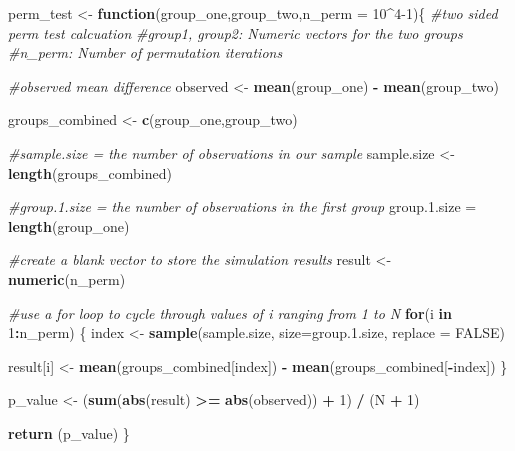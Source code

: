 \documentclass[
]{article}
\newenvironment{Shaded}{\begin{snugshade}}{\end{snugshade}}
\newcommand{\AttributeTok}[1]{\textcolor[rgb]{0.13,0.29,0.53}{#1}}
\newcommand{\CommentTok}[1]{\textcolor[rgb]{0.56,0.35,0.01}{\textit{#1}}}
\newcommand{\ConstantTok}[1]{\textcolor[rgb]{0.56,0.35,0.01}{#1}}
\newcommand{\ControlFlowTok}[1]{\textcolor[rgb]{0.13,0.29,0.53}{\textbf{#1}}}
\newcommand{\DecValTok}[1]{\textcolor[rgb]{0.00,0.00,0.81}{#1}}
\newcommand{\FloatTok}[1]{\textcolor[rgb]{0.00,0.00,0.81}{#1}}
\newcommand{\FunctionTok}[1]{\textcolor[rgb]{0.13,0.29,0.53}{\textbf{#1}}}
\newcommand{\NormalTok}[1]{#1}
\newcommand{\OtherTok}[1]{\textcolor[rgb]{0.56,0.35,0.01}{#1}}
\newcommand{\SpecialCharTok}[1]{\textcolor[rgb]{0.81,0.36,0.00}{\textbf{#1}}}
\begin{document}
\begin{Shaded}
\begin{Highlighting}[]
\NormalTok{perm\_test }\OtherTok{\textless{}{-}} \ControlFlowTok{function}\NormalTok{(group\_one,group\_two,}\AttributeTok{n\_perm =} \DecValTok{10}\SpecialCharTok{\^{}}\DecValTok{4{-}1}\NormalTok{)\{}
\CommentTok{\#two sided perm test calcuation}
\CommentTok{\#group1, group2: Numeric vectors for the two groups}
\CommentTok{\#n\_perm: Number of permutation iterations}
  
  \CommentTok{\#observed mean difference}
\NormalTok{  observed }\OtherTok{\textless{}{-}} \FunctionTok{mean}\NormalTok{(group\_one) }\SpecialCharTok{{-}} \FunctionTok{mean}\NormalTok{(group\_two)}

\NormalTok{  groups\_combined }\OtherTok{\textless{}{-}} \FunctionTok{c}\NormalTok{(group\_one,group\_two)}

  \CommentTok{\#sample.size = the number of observations in our sample}
\NormalTok{  sample.size }\OtherTok{\textless{}{-}} \FunctionTok{length}\NormalTok{(groups\_combined)}

  \CommentTok{\#group.1.size = the number of observations in the first group}
\NormalTok{  group.}\FloatTok{1.}\NormalTok{size }\OtherTok{=} \FunctionTok{length}\NormalTok{(group\_one)}

  \CommentTok{\#create a blank vector to store the simulation results}
\NormalTok{  result }\OtherTok{\textless{}{-}} \FunctionTok{numeric}\NormalTok{(n\_perm)}

  \CommentTok{\#use a for loop to cycle through values of i ranging from 1 to N}
  \ControlFlowTok{for}\NormalTok{(i }\ControlFlowTok{in} \DecValTok{1}\SpecialCharTok{:}\NormalTok{n\_perm)}
\NormalTok{  \{}
\NormalTok{    index }\OtherTok{\textless{}{-}} \FunctionTok{sample}\NormalTok{(sample.size, }\AttributeTok{size=}\NormalTok{group.}\FloatTok{1.}\NormalTok{size, }\AttributeTok{replace =} \ConstantTok{FALSE}\NormalTok{)}

\NormalTok{    result[i] }\OtherTok{\textless{}{-}} \FunctionTok{mean}\NormalTok{(groups\_combined[index]) }\SpecialCharTok{{-}} 
                \FunctionTok{mean}\NormalTok{(groups\_combined[}\SpecialCharTok{{-}}\NormalTok{index])}
\NormalTok{  \}}

\NormalTok{  p\_value }\OtherTok{\textless{}{-}}\NormalTok{ (}\FunctionTok{sum}\NormalTok{(}\FunctionTok{abs}\NormalTok{(result) }\SpecialCharTok{\textgreater{}=} \FunctionTok{abs}\NormalTok{(observed)) }\SpecialCharTok{+} \DecValTok{1}\NormalTok{) }\SpecialCharTok{/}\NormalTok{ (N }\SpecialCharTok{+} \DecValTok{1}\NormalTok{)}

  \FunctionTok{return}\NormalTok{ (p\_value)}
\NormalTok{\}}
\end{Highlighting}
\end{Shaded}
\end{document}
